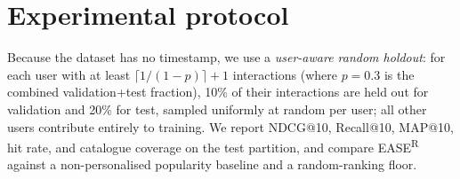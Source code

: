 \section{Experimental protocol}
Because the dataset has no timestamp, we use a \emph{user-aware random
holdout}: for each user with at least $\lceil 1/(1-p)\rceil + 1$ interactions
(where $p=0.3$ is the combined validation+test fraction), 10\% of their
interactions are held out for validation and 20\% for test, sampled
uniformly at random per user; all other users contribute entirely to
training. We report NDCG@10, Recall@10, MAP@10, hit rate, and catalogue
coverage on the test partition, and compare EASE\textsuperscript{R} against
a non-personalised popularity baseline and a random-ranking floor.
